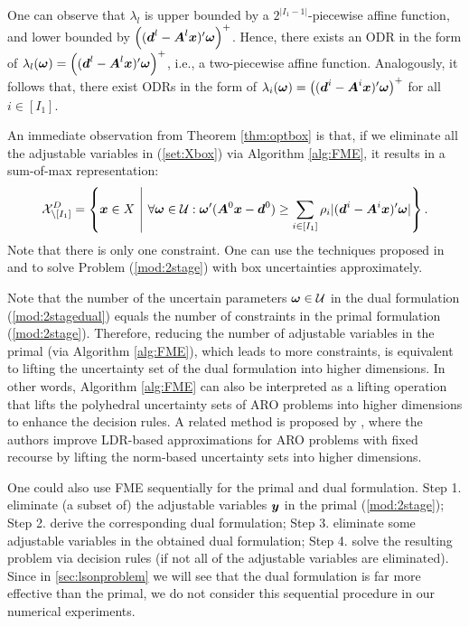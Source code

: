 \documentclass[fleqn,orsc,blindrev]{informs4}
\newcommand{\mb}[1]{\mbox{\boldmath \ensuremath{#1}}}
\begin{document}
	One can observe that $\lambda_l$ is upper bounded by a $2^{|I_1-1|}$-piecewise affine function, and lower bounded by $\left((\mb{d}^l- \mb{A}^l\mb{x})'\mb{\omega}\right)^+$. Hence, there exists an ODR in the form of $\lambda_l(\mb{\omega})=\left((\mb{d}^l- \mb{A}^l\mb{x})'\mb{\omega}\right)^+$, i.e., a two-piecewise affine function. Analogously, it follows that, there exist ODRs in the form of  $\lambda_i(\mb{\omega})=\left((\mb{d}^i- \mb{A}^i\mb{x})'\mb{\omega}\right)^+$ for all $i\in [I_1]$.   \hfill \Halmos
	
	An immediate observation from Theorem \ref{thm:optbox} is that, if we eliminate all the adjustable variables in (\ref{set:Xbox}) via Algorithm \ref{alg:FME}, it results in a sum-of-max representation:
\begin{equation*}
		\mathcal{X}^D_{\setminus [I_1]}=  \left\{ \mb{x} \in X \enskip \vline \enskip \forall \mb{\omega} \in \mathcal{U}:  \mb{\omega}' (\mb{A}^0\mb{x}-\mb{d}^0)  \ge 	 \sum_{i \in [I_1]}  \rho_i|(\mb{d}^i- \mb{A}^i\mb{x})'\mb{\omega}| 		\right\}.
\end{equation*}
	Note that there is only one constraint. One can use the techniques proposed in \cite{gd13} and \cite{ad16b} to solve Problem (\ref{mod:2stage}) with box uncertainties approximately. 

	 {Note that the number of the uncertain parameters $\mb{\omega}\in \mathcal{U}$ in the dual formulation (\ref{mod:2stagedual}) equals the number of constraints in the primal formulation (\ref{mod:2stage}). Therefore, reducing the number of adjustable variables in the primal (via Algorithm \ref{alg:FME}), which leads to more constraints, is equivalent to lifting the uncertainty set of the dual formulation into higher dimensions. In other words, Algorithm \ref{alg:FME} can also be interpreted as a lifting operation that lifts the polyhedral uncertainty sets of ARO problems into higher dimensions to enhance the decision rules. A related method is proposed by \cite{cz09}, where the authors improve LDR-based approximations for ARO problems with fixed recourse by lifting the norm-based uncertainty sets into higher dimensions. 
		
    One could also use FME sequentially for the primal and dual formulation. Step 1. eliminate (a subset of) the adjustable variables $\mb{y}$ in the primal (\ref{mod:2stage}); Step 2. derive the corresponding dual formulation; Step 3.  eliminate some adjustable variables in the obtained dual formulation; Step 4. solve the resulting problem via decision rules (if not all of the adjustable variables are eliminated). Since in \textsection \ref{sec:lsonproblem} we will see that the dual formulation is far more effective than the primal, we do not consider this sequential procedure in our numerical experiments.}
	
\end{document}

